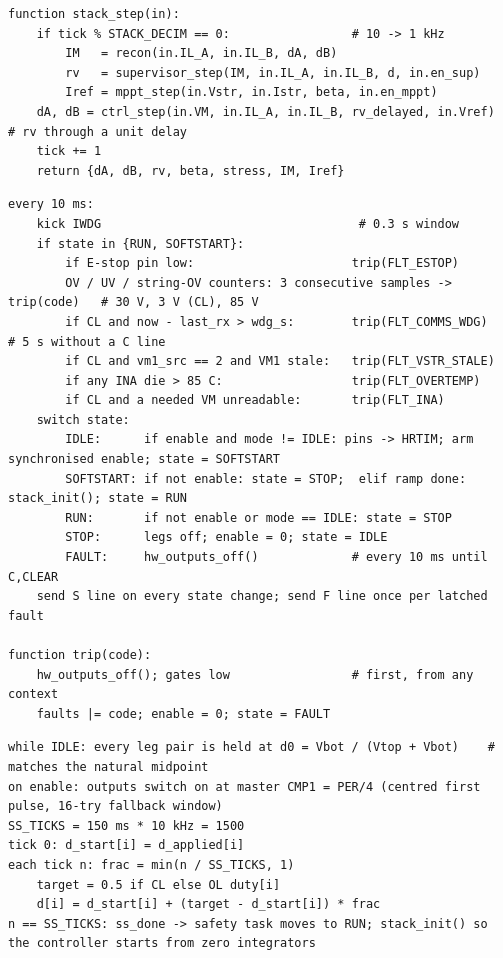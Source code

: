 \begin{lstlisting}[caption={Stack scheduler (\code{stack.c}): controller every tick, supervisory layers every 10th.},label={lst:stack}]
function stack_step(in):
    if tick % STACK_DECIM == 0:                 # 10 -> 1 kHz
        IM   = recon(in.IL_A, in.IL_B, dA, dB)
        rv   = supervisor_step(IM, in.IL_A, in.IL_B, d, in.en_sup)
        Iref = mppt_step(in.Vstr, in.Istr, beta, in.en_mppt)
    dA, dB = ctrl_step(in.VM, in.IL_A, in.IL_B, rv_delayed, in.Vref)   # rv through a unit delay
    tick += 1
    return {dA, dB, rv, beta, stress, IM, Iref}
\end{lstlisting}

\begin{lstlisting}[caption={Safety task and state machine, 100\,Hz (\code{app.c}); \code{trip()} may run from any context.},label={lst:fsm}]
every 10 ms:
    kick IWDG                                    # 0.3 s window
    if state in {RUN, SOFTSTART}:
        if E-stop pin low:                      trip(FLT_ESTOP)
        OV / UV / string-OV counters: 3 consecutive samples -> trip(code)   # 30 V, 3 V (CL), 85 V
        if CL and now - last_rx > wdg_s:        trip(FLT_COMMS_WDG)         # 5 s without a C line
        if CL and vm1_src == 2 and VM1 stale:   trip(FLT_VSTR_STALE)
        if any INA die > 85 C:                  trip(FLT_OVERTEMP)
        if CL and a needed VM unreadable:       trip(FLT_INA)
    switch state:
        IDLE:      if enable and mode != IDLE: pins -> HRTIM; arm synchronised enable; state = SOFTSTART
        SOFTSTART: if not enable: state = STOP;  elif ramp done: stack_init(); state = RUN
        RUN:       if not enable or mode == IDLE: state = STOP
        STOP:      legs off; enable = 0; state = IDLE
        FAULT:     hw_outputs_off()             # every 10 ms until C,CLEAR
    send S line on every state change; send F line once per latched fault

function trip(code):
    hw_outputs_off(); gates low                 # first, from any context
    faults |= code; enable = 0; state = FAULT
\end{lstlisting}

\begin{lstlisting}[caption={Soft start (\code{app.c} + \code{hw\_legs\_enable\_sync}).},label={lst:softstart}]
while IDLE: every leg pair is held at d0 = Vbot / (Vtop + Vbot)    # matches the natural midpoint
on enable: outputs switch on at master CMP1 = PER/4 (centred first pulse, 16-try fallback window)
SS_TICKS = 150 ms * 10 kHz = 1500
tick 0: d_start[i] = d_applied[i]
each tick n: frac = min(n / SS_TICKS, 1)
    target = 0.5 if CL else OL duty[i]
    d[i] = d_start[i] + (target - d_start[i]) * frac
n == SS_TICKS: ss_done -> safety task moves to RUN; stack_init() so the controller starts from zero integrators
\end{lstlisting}

